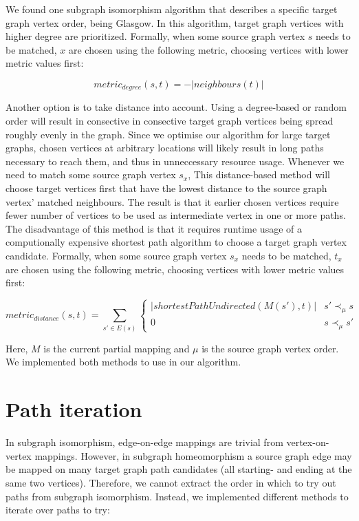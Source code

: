 We found one subgraph isomorphism algorithm that describes a specific target graph vertex order, being Glasgow\cite{McCreesh2015}. In this algorithm, target graph vertices with higher degree are prioritized. Formally, when some source graph vertex $s$ needs to be matched, $x$ are chosen using the following metric, choosing vertices with lower metric values first:

$$\mathit{metric}_\mathit{degree}(s, t)=-|\mathit{neighbours}(t)|$$

Another option is to take distance into account. Using a degree-based or random order will result in consective in consective target graph vertices being spread roughly evenly in the graph. Since we optimise our algorithm for large target graphs, chosen vertices at arbitrary locations will likely result in long paths necessary to reach them, and thus in unneccessary resource usage. Whenever we need to match some source graph vertex $s_x$, This distance-based method will choose target vertices first that have the lowest distance to the source graph vertex' matched neighbours. The result is that it earlier chosen vertices require fewer number of vertices to be used as intermediate vertex in one or more paths. The disadvantage of this method is that it requires runtime usage of a computionally expensive shortest path algorithm to choose a target graph vertex candidate. Formally, when some source graph vertex $s_x$ needs to be matched, $t_x$ are chosen using the following metric, choosing vertices with lower metric values first:


$$\mathit{metric}_\mathit{distance}(s, t)=\sum_{s' \in E(s)} \begin{cases}
|\mathit{shortestPathUndirected}(M(s'), t)| & s' \prec_\mu s\\
0 & s \prec_\mu s'
\end{cases}$$

Here, $M$ is the current partial mapping and $\mu$ is the source graph vertex order. We implemented both methods to use in our algorithm.

\section{Path iteration}
\label{sec:pathIteration}
In subgraph isomorphism, edge-on-edge mappings are trivial from vertex-on-vertex mappings. However, in subgraph homeomorphism a source graph edge may be mapped on many target graph path candidates (all starting- and ending at the same two vertices). Therefore, we cannot extract the order in which to try out paths from subgraph isomorphism. Instead, we implemented different methods to iterate over paths to try:

